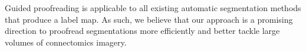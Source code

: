 Guided proofreading is applicable to all existing automatic segmentation methods that produce a label map.
As such, we believe that our approach is a promising direction to proofread segmentations more efficiently and better tackle large volumes of connectomics imagery.

%
%
